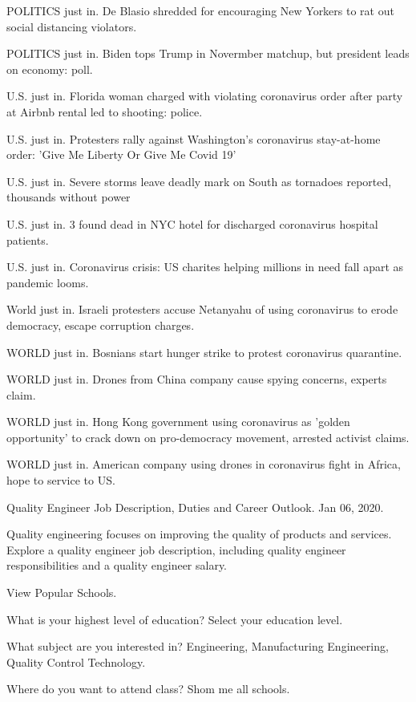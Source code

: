 POLITICS just in.
De Blasio shredded for encouraging New
Yorkers to rat out social distancing
violators.

POLITICS just in.
Biden tops Trump in Novermber matchup,
but president leads on economy: poll.

U.S. just in.
Florida woman charged with violating
coronavirus order after
party at Airbnb rental led to shooting:
police.

U.S. just in.
Protesters rally against Washington's
coronavirus stay-at-home order:
'Give Me Liberty Or Give Me Covid 19'

U.S. just in.
Severe storms leave deadly mark on
South as tornadoes reported,
thousands without power

U.S. just in.
3 found dead in NYC hotel for discharged
coronavirus hospital patients.

U.S. just in.
Coronavirus crisis: US charites helping
millions in need fall apart as pandemic
looms.

World just in.
Israeli protesters accuse Netanyahu of
using coronavirus to erode democracy,
escape corruption charges.

WORLD just in.
Bosnians start hunger strike to protest
coronavirus quarantine.

WORLD just in.
Drones from China company cause spying
concerns, experts claim.

WORLD just in.
Hong Kong government using coronavirus
as 'golden opportunity' to crack down
on pro-democracy movement, arrested
activist claims.

WORLD just in.
American company using drones in
coronavirus fight in Africa,
hope to service to US.

\smallskip{}

\fi

Quality Engineer Job Description,
Duties and Career Outlook.
Jan 06, 2020.

Quality engineering focuses on improving
the quality of products and services.
Explore a quality engineer job description,
including quality engineer responsibilities and
a quality engineer salary.

View Popular Schools.

What is your highest level of education?
Select your education level.

What subject are you interested in?
Engineering, Manufacturing Engineering,
Quality Control Technology.

Where do you want to attend class?
Shom me all schools.

